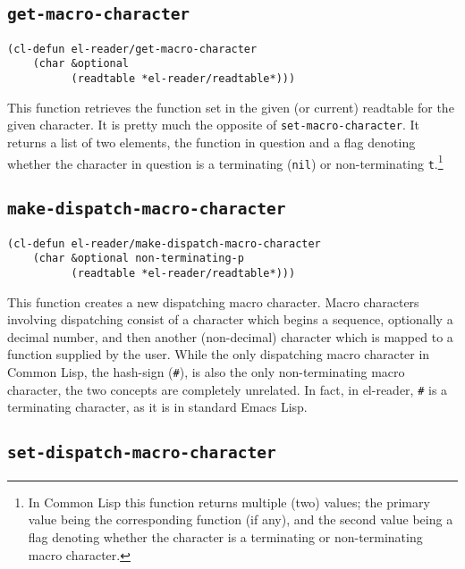 \documentclass[a4paper,10pt,twoside]{report}
\newcommand{\el}{Emacs Lisp}
\newcommand{\cl}{Common Lisp}
\newcommand{\elr}{el-reader}
\newcommand{\sym}[1]{\texttt{#1}}
\newcommand{\fun}[1]{\texttt{#1}}
\newcommand{\nil}{\sym{nil}}
\newcommand{\tee}{\sym{t}}
\begin{document}
\subsection{\fun{get-macro-character}}
\label{subsec:get-macro-character}

\begin{lstlisting}[style=lispinline]
(cl-defun el-reader/get-macro-character
    (char &optional
          (readtable *el-reader/readtable*)))
\end{lstlisting}

This function retrieves the function set in the given (or current) readtable for
the given character.  It is pretty much the opposite of
\fun{set-macro-character}.  It returns a list of two elements, the function in
question and a flag denoting whether the character in question is a terminating
(\nil{}) or non-terminating \tee{}.\footnote{In \cl{} this function returns
  multiple (two) values; the primary value being the corresponding function (if
  any), and the second value being a flag denoting whether the character is a
  terminating or non-terminating macro character.}

\subsection{\fun{make-dispatch-macro-character}}
\label{subsec:make-dispatch-macro-character}

\begin{lstlisting}[style=lispinline]
(cl-defun el-reader/make-dispatch-macro-character
    (char &optional non-terminating-p
          (readtable *el-reader/readtable*)))
\end{lstlisting}

This function creates a new dispatching macro character.  Macro characters
involving dispatching consist of a character which begins a sequence, optionally
a decimal number, and then another (non-decimal) character which is mapped to a
function supplied by the user.  While the only dispatching macro character in
\cl{}, the hash-sign (\texttt{\#}), is also the only non-terminating macro
character, the two concepts are completely unrelated.  In fact, in \elr{},
\texttt{\#} is a terminating character, as it is in standard \el{}.

\subsection{\fun{set-dispatch-macro-character}}
\label{subsec:set-dispatch-macro-character}
\end{document}
